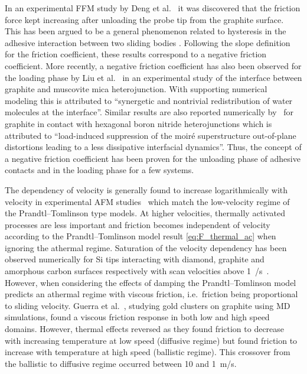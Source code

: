 In an experimental \acrshort{FFM} study by Deng et al.~\cite{deng_adhesion-dependent_2012} it was discovered that
the friction force kept increasing after unloading the probe tip from the
graphite surface. This has been argued to be a general phenomenon
related to hysteresis in the adhesive interaction between two sliding bodies
\cite{thormann_negative_2013}. Following the slope definition for the friction
coefficient, these results correspond to a negative friction coefficient. More recently, a negative friction coefficient has also been observed for the loading phase by Liu et al.~\cite{Liu_2020} in an experimental study of the interface between graphite and muscovite mica heterojunction. With supporting numerical modeling this is attributed to ``synergetic and nontrivial redistribution of water molecules at the interface''. Similar results are also reported numerically by~\cite{Mandelli_2019} for graphite in contact with hexagonal boron nitride heterojunctions which is attributed to ``load-induced suppression of the moiré superstructure out-of-plane distortions leading to a less dissipative interfacial dynamics''. Thus, the concept of a negative friction coefficient has been proven for the unloading phase of adhesive contacts and in the loading phase for a few systems. 

The dependency of velocity is generally found to increase logarithmically with
velocity in experimental \acrshort{AFM} studies~\cite[p. 201]{gnecco_meyer_2015}
which match the low-velocity regime of the Prandtl–Tomlinson type models. At
higher velocities, thermally activated processes are less important and friction
becomes independent of velocity according to the Prandtl–Tomlinson model result
\cref{eq:F_thermal_ac} when ignoring the athermal regime. Saturation of the
velocity dependency has been observed numerically for Si tips interacting with
diamond, graphite and amorphous carbon surfaces respectively with scan
velocities above \SI{1}{\mu/s}~\cite{zworner1998velocity}. However, when
considering the effects of damping the Prandtl–Tomlinson model predicts an
athermal regime with viscous friction, i.e.\ friction being proportional to
sliding velocity. Guerra et al.~\cite{Guerra_2010}, studying gold clusters on
graphite using \acrshort{MD} simulations, found a viscous friction response in
both low and high speed domains. However, thermal effects reversed as they found
friction to decrease with increasing temperature at low speed (diffusive regime)
but found friction to increase with temperature at high speed (ballistic
regime). This crossover from the ballistic to diffusive regime occurred between
10 and \SI{1}{m/s}. 



